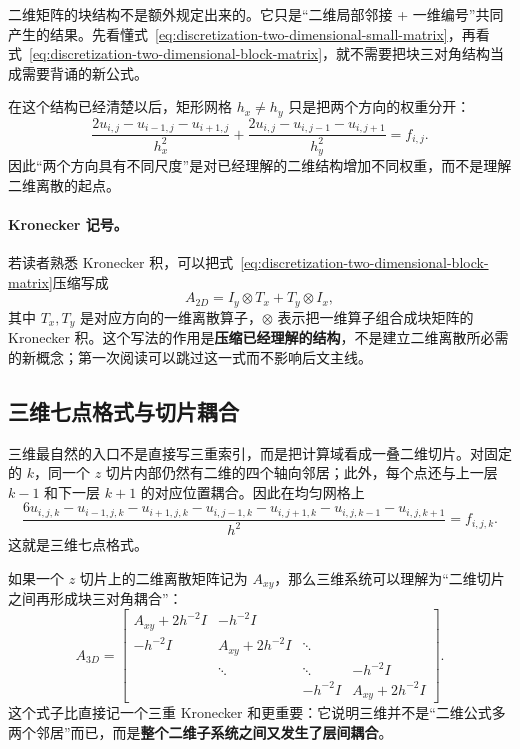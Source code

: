 \begin{keybox}
二维矩阵的块结构不是额外规定出来的。它只是“二维局部邻接 + 一维编号”共同产生的结果。先看懂式~\eqref{eq:discretization-two-dimensional-small-matrix}，再看式~\eqref{eq:discretization-two-dimensional-block-matrix}，就不需要把块三对角结构当成需要背诵的新公式。
\end{keybox}

在这个结构已经清楚以后，矩形网格 $h_x\neq h_y$ 只是把两个方向的权重分开：
\begin{equation}
\boxed{
\frac{2u_{i,j}-u_{i-1,j}-u_{i+1,j}}{h_x^2}
+
\frac{2u_{i,j}-u_{i,j-1}-u_{i,j+1}}{h_y^2}
=f_{i,j}.
}
\label{eq:discretization-two-dimensional-rectangular-grid}
\end{equation}
因此“两个方向具有不同尺度”是对已经理解的二维结构增加不同权重，而不是理解二维离散的起点。

\paragraph{Kronecker 记号。}
若读者熟悉 Kronecker 积，可以把式~\eqref{eq:discretization-two-dimensional-block-matrix}压缩写成
\begin{equation}
A_{2D}=I_y\otimes T_x+T_y\otimes I_x,
\label{eq:discretization-two-dimensional-kronecker}
\end{equation}
其中 $T_x,T_y$ 是对应方向的一维离散算子，$\otimes$ 表示把一维算子组合成块矩阵的 Kronecker 积。这个写法的作用是\textbf{压缩已经理解的结构}，不是建立二维离散所必需的新概念；第一次阅读可以跳过这一式而不影响后文主线。

\subsection{三维七点格式与切片耦合}

三维最自然的入口不是直接写三重索引，而是把计算域看成一叠二维切片。对固定的 $k$，同一个 $z$ 切片内部仍然有二维的四个轴向邻居；此外，每个点还与上一层 $k-1$ 和下一层 $k+1$ 的对应位置耦合。因此在均匀网格上
\begin{equation}
\boxed{
\frac{
6u_{i,j,k}
-u_{i-1,j,k}-u_{i+1,j,k}
-u_{i,j-1,k}-u_{i,j+1,k}
-u_{i,j,k-1}-u_{i,j,k+1}
}{h^2}
=f_{i,j,k}.
}
\label{eq:discretization-three-dimensional-seven-point}
\end{equation}
这就是三维七点格式。

如果一个 $z$ 切片上的二维离散矩阵记为 $A_{xy}$，那么三维系统可以理解为“二维切片之间再形成块三对角耦合”：
\begin{equation}
A_{3D}
=\begin{bmatrix}
A_{xy}+2h^{-2}I&-h^{-2}I&&\\
-h^{-2}I&A_{xy}+2h^{-2}I&\ddots&\\
&\ddots&\ddots&-h^{-2}I\\
&&-h^{-2}I&A_{xy}+2h^{-2}I
\end{bmatrix}.
\label{eq:discretization-three-dimensional-slice-matrix}
\end{equation}
这个式子比直接记一个三重 Kronecker 和更重要：它说明三维并不是“二维公式多两个邻居”而已，而是\textbf{整个二维子系统之间又发生了层间耦合}。

